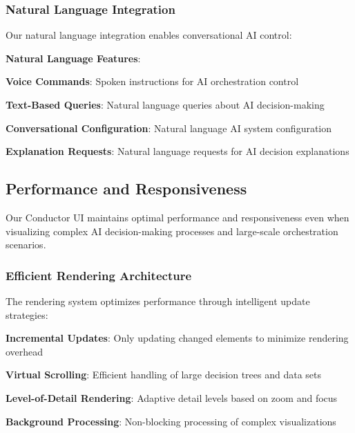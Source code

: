 \subsubsection*{Natural Language Integration}

Our natural language integration enables conversational AI control:

\begin{alertbox}
\textbf{Natural Language Features}:
\begin{compactlist}
    \item \textbf{Voice Commands}: Spoken instructions for AI orchestration control
    \item \textbf{Text-Based Queries}: Natural language queries about AI decision-making
    \item \textbf{Conversational Configuration}: Natural language AI system configuration
    \item \textbf{Explanation Requests}: Natural language requests for AI decision explanations
\end{compactlist}
\end{alertbox}

\subsection*{Performance and Responsiveness}

Our Conductor UI maintains optimal performance and responsiveness even when visualizing complex AI decision-making processes and large-scale orchestration scenarios.

\subsubsection*{Efficient Rendering Architecture}

The rendering system optimizes performance through intelligent update strategies:

\begin{expandedlist}
    \item \textbf{Incremental Updates}: Only updating changed elements to minimize rendering overhead
    \item \textbf{Virtual Scrolling}: Efficient handling of large decision trees and data sets
    \item \textbf{Level-of-Detail Rendering}: Adaptive detail levels based on zoom and focus
    \item \textbf{Background Processing}: Non-blocking processing of complex visualizations
\end{expandedlist}

